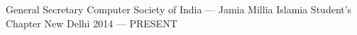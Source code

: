 
\begin{cvhonours}

  \cvhonour%
    {General Secretary} %
    {Computer Society of India --- Jamia Millia Islamia Student's Chapter} %
    {New Delhi} %
    {2014 --- PRESENT} %

\end{cvhonours}

